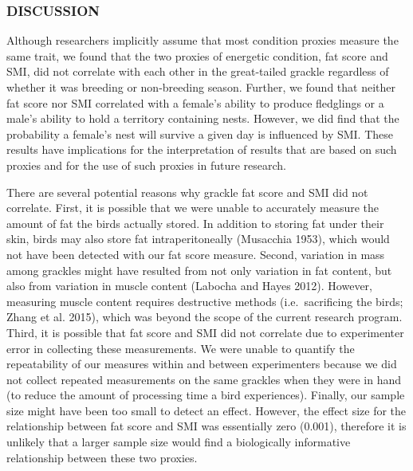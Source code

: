 \documentclass[
]{article}
\begin{document}
\hypertarget{discussion}{%
\subsubsection{DISCUSSION}\label{discussion}}

Although researchers implicitly assume that most condition proxies
measure the same trait, we found that the two proxies of energetic
condition, fat score and SMI, did not correlate with each other in the
great-tailed grackle regardless of whether it was breeding or
non-breeding season. Further, we found that neither fat score nor SMI
correlated with a female's ability to produce fledglings or a male's
ability to hold a territory containing nests. However, we did find that
the probability a female's nest will survive a given day is influenced
by SMI. These results have implications for the interpretation of
results that are based on such proxies and for the use of such proxies
in future research.

There are several potential reasons why grackle fat score and SMI did
not correlate. First, it is possible that we were unable to accurately
measure the amount of fat the birds actually stored. In addition to
storing fat under their skin, birds may also store fat intraperitoneally
(Musacchia 1953), which would not have been detected with our fat score
measure. Second, variation in mass among grackles might have resulted
from not only variation in fat content, but also from variation in
muscle content (Labocha and Hayes 2012). However, measuring muscle
content requires destructive methods (i.e.~sacrificing the birds; Zhang
et al. 2015), which was beyond the scope of the current research
program. Third, it is possible that fat score and SMI did not correlate
due to experimenter error in collecting these measurements. We were
unable to quantify the repeatability of our measures within and between
experimenters because we did not collect repeated measurements on the
same grackles when they were in hand (to reduce the amount of processing
time a bird experiences). Finally, our sample size might have been too
small to detect an effect. However, the effect size for the relationship
between fat score and SMI was essentially zero (0.001), therefore it is
unlikely that a larger sample size would find a biologically informative
relationship between these two proxies.
\end{document}
